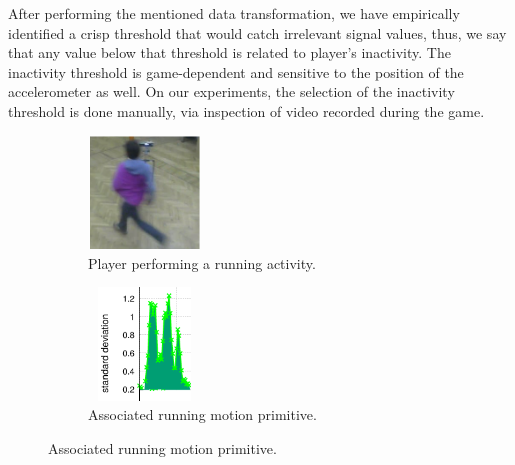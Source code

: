 After performing the mentioned data transformation, we have empirically identified a crisp threshold that would catch irrelevant signal values, thus, we say that any value below that threshold is related to player's inactivity.
The inactivity threshold is game-dependent and sensitive to the position of the accelerometer as well. On our experiments, the selection of the inactivity threshold is done manually, via inspection of video recorded during the game.

\begin{figure}[thpb]
    \centering
    \begin{subfigure}[b]{0.3\textwidth}
     	\centering
        \includegraphics[width=3cm,height=3cm]{images/04-activity/enricorun.png}
        \caption{Player performing a running activity.}
	\end{subfigure}
    \begin{subfigure}[b]{0.3\textwidth}
     	\centering
        \includegraphics[width=3cm,height=3cm]{images/04-activity/run1.png}
        \caption{Associated running motion primitive.}
	\end{subfigure}
    \label{running}
\end{figure}

